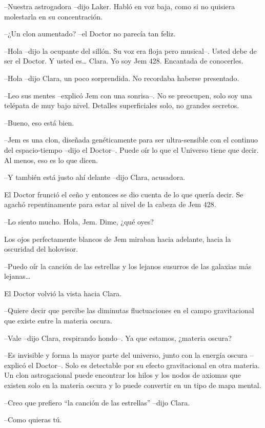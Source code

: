 {--Nuestra astrogadora --dijo Laker. Habló en voz baja, como si no
quisiera molestarla en su concentración.}

{--¿Un clon aumentado? --el Doctor no parecía tan feliz.}

{--Hola --dijo la ocupante del sillón. Su voz era floja pero musical--.
 Usted debe de ser el Doctor. Y usted es\ldots{} Clara. Yo soy Jem 428.
Encantada de conocerles.}

{--Hola --dijo Clara, un poco sorprendida. No recordaba haberse
presentado.}

{--Leo sus mentes --explicó Jem con una sonrisa--. No se preocupen, solo
 soy una telépata de muy bajo nivel. Detalles superficiales solo, no
grandes secretos.}

{--Bueno, eso está bien.}

{--Jem es una clon, diseñada genéticamente para ser ultra-sensible con el
 continuo del espacio-tiempo --dijo el Doctor--. Puede oír lo que el
Universo tiene que decir. Al menos, eso es lo que dicen.}

{--Y también está justo ahí delante --dijo Clara, acusadora.}

{El Doctor frunció el ceño y entonces se dio cuenta de lo que quería
 decir. Se agachó repentinamente para estar al nivel de la cabeza de Jem
428.}

{--Lo siento mucho. Hola, Jem. Dime, ¿qué oyes?}

{Los ojos perfectamente blancos de Jem miraban hacia adelante, hacia la
oscuridad del holovisor.}

{--Puedo oír la canción de las estrellas y los lejanos susurros de las
 galaxias más lejanas\ldots{}}

{El Doctor volvió la vista hacia Clara.}

{--Quiere decir que percibe las diminutas fluctuaciones en el campo
gravitacional que existe entre la materia oscura.}

{--Vale --dijo Clara, respirando hondo--. Ya que estamos, ¿materia
oscura?}

{--Es invisible y forma la mayor parte del universo, junto con la energía
 oscura --explicó el Doctor--. Solo es detectable por su efecto
 gravitacional en otra materia. Un clon astrogacional puede encontrar los
 hilos y los nodos de axiomas que existen solo en la materia oscura y lo
puede convertir en un tipo de mapa mental.}

{--Creo que prefiero ``la canción de las estrellas'' --dijo Clara.}

{--Como quieras tú.}

